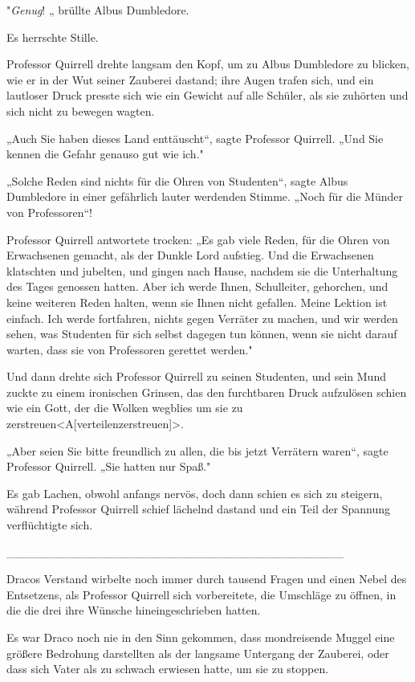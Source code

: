 {"\emph{Genug}! „ brüllte Albus Dumbledore.

Es herrschte Stille.

Professor Quirrell drehte langsam den Kopf, um zu Albus Dumbledore zu blicken, wie er in der Wut seiner Zauberei dastand; ihre Augen trafen sich, und ein lautloser Druck presste sich wie ein Gewicht auf alle Schüler, als sie zuhörten und sich nicht zu bewegen wagten.

„Auch Sie haben dieses Land enttäuscht“, sagte Professor Quirrell. „Und Sie kennen die Gefahr genauso gut wie ich."

„Solche Reden sind nichts für die Ohren von Studenten“, sagte Albus Dumbledore in einer gefährlich lauter werdenden Stimme. „Noch für die Münder von Professoren“!

Professor Quirrell antwortete trocken: „Es gab viele Reden, für die Ohren von Erwachsenen gemacht, als der Dunkle Lord aufstieg. Und die Erwachsenen klatschten und jubelten, und gingen nach Hause, nachdem sie die Unterhaltung des Tages genossen hatten. Aber ich werde Ihnen, Schulleiter, gehorchen, und keine weiteren Reden halten, wenn sie Ihnen nicht gefallen. Meine Lektion ist einfach. Ich werde fortfahren, nichts gegen Verräter zu machen, und wir werden sehen, was Studenten für sich selbst dagegen tun können, wenn sie nicht darauf warten, dass sie von Professoren gerettet werden."

Und dann drehte sich Professor Quirrell zu seinen Studenten, und sein Mund zuckte zu einem ironischen Grinsen, das den furchtbaren Druck aufzulösen schien wie ein Gott, der die Wolken wegblies um sie zu zerstreuen\textless A{[}verteilen\textbar zerstreuen{]}\textgreater.

„Aber seien Sie bitte freundlich zu allen, die bis jetzt Verrätern waren“, sagte Professor Quirrell. „Sie hatten nur Spaß."

Es gab Lachen, obwohl anfangs nervös, doch dann schien es sich zu steigern, während Professor Quirrell schief lächelnd dastand und ein Teil der Spannung verflüchtigte sich.

\_\_\_\_\_\_\_\_\_\_\_\_\_\_\_\_\_\_\_\_\_\_\_\_\_\_\_\_\_\_\_\_\_\_\_\_\_\_\_\_

Dracos Verstand wirbelte noch immer durch tausend Fragen und einen Nebel des Entsetzens, als Professor Quirrell sich vorbereitete, die Umschläge zu öffnen, in die die drei ihre Wünsche hineingeschrieben hatten.

Es war Draco noch nie in den Sinn gekommen, dass mondreisende Muggel eine größere Bedrohung darstellten als der langsame Untergang der Zauberei, oder dass sich Vater als zu schwach erwiesen hatte, um sie zu stoppen.

}

